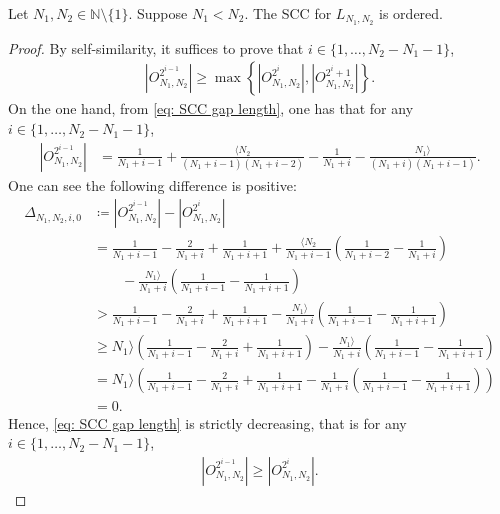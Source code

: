 \documentclass{ws-ijnt}
\begin{document}
	\begin{proposition}
		Let $N_1,N_2\in\mathbb{N}\setminus\{1\}$. Suppose $N_1<N_2$. The SCC for $L_{N_1,N_2}$ is ordered.
	\end{proposition}
	\begin{proof}
		By self-similarity, it suffices to prove that $i\in\{1,\ldots,N_2-N_1-1\}$,
		\begin{align*}
			\left\lvert O_{N_1,N_2}^{2^{i-1}}\right\rvert
			\geq\max{\left\{\left\lvert O_{N_1,N_2}^{2^{i}}\right\rvert,\left\lvert O_{N_1,N_2}^{2^i+1}\right\rvert\right\}}.
		\end{align*}
		On the one hand, from \eqref{eq: SCC gap length}, one has that for any $i\in\{1,\ldots,N_2-N_1-1\}$,
		\begin{align*}
			\left\lvert O_{N_1,N_2}^{2^{i-1}}\right\rvert
			&= \frac{1}{N_1+i-1}+\frac{\langle N_2}{(N_1+i-1)(N_1+i-2)}-\frac{1}{N_1+i}-\frac{N_1\rangle}{(N_1+i)(N_1+i-1)}.
		\end{align*}
		One can see the following difference is positive:
		\begin{align*}
			\Delta_{N_1,N_2,i,0}
			&\coloneqq \left\lvert O_{N_1,N_2}^{2^{i-1}}\right\rvert-\left\lvert O_{N_1,N_2}^{2^{i}}\right\rvert \\
			&=\frac{1}{N_1+i-1}-\frac{2}{N_1+i}+\frac{1}{N_1+i+1}+\frac{\langle N_2}{N_1+i-1}\left(\frac{1}{N_1+i-2}-\frac{1}{N_1+i}\right) \\
			&\qquad-\frac{N_1 \rangle}{N_1+i}\left(\frac{1}{N_1+i-1}-\frac{1}{N_1+i+1}\right) \\
			&>\frac{1}{N_1+i-1}-\frac{2}{N_1+i}+\frac{1}{N_1+i+1}-\frac{N_1 \rangle}{N_1+i}\left(\frac{1}{N_1+i-1}-\frac{1}{N_1+i+1}\right) \\
			&\geq N_1 \rangle\left(\frac{1}{N_1+i-1}-\frac{2}{N_1+i}+\frac{1}{N_1+i+1}\right)-\frac{N_1 \rangle}{N_1+i}\left(\frac{1}{N_1+i-1}-\frac{1}{N_1+i+1}\right) \\
			&=N_1 \rangle\left(\frac{1}{N_1+i-1}-\frac{2}{N_1+i}+\frac{1}{N_1+i+1}-\frac{1}{N_1+i}\left(\frac{1}{N_1+i-1}-\frac{1}{N_1+i+1}\right)\right) \\
			&=0.
		\end{align*}
		Hence, \eqref{eq: SCC gap length} is strictly decreasing, that is
		for any $i\in\{1,\ldots,N_2-N_1-1\}$,
		\begin{align*}
			\left\lvert O_{N_1,N_2}^{2^{i-1}}\right\rvert
			\geq \left\lvert O_{N_1,N_2}^{2^{i}}\right\rvert.
		\end{align*}
		

\end{proof}
\end{document}
